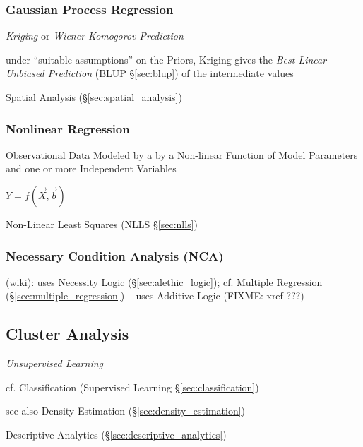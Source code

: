 \subsubsection{Gaussian Process Regression}
\label{sec:gaussian_process_regression}

\emph{Kriging} or \emph{Wiener-Komogorov Prediction}

under ``suitable assumptions'' on the Priors, Kriging gives the \emph{Best
  Linear Unbiased Prediction} (BLUP \S\ref{sec:blup}) of the intermediate values

\fist Spatial Analysis (\S\ref{sec:spatial_analysis})



\subsubsection{Nonlinear Regression}\label{sec:nonlinear_regression}

Observational Data Modeled by a by a Non-linear Function of Model Parameters and
one or more Independent Variables

$Y = f(\vec{X}, \vec{b})$

Non-Linear Least Squares (NLLS \S\ref{sec:nlls})



\subsubsection{Necessary Condition Analysis (NCA)}\label{sec:nca}

(wiki): uses Necessity Logic (\S\ref{sec:alethic_logic});
cf. Multiple Regression (\S\ref{sec:multiple_regression}) -- uses Additive Logic
(FIXME: xref ???)



\subsection{Cluster Analysis}\label{sec:cluster_analysis}

\emph{Unsupervised Learning}

cf. Classification (Supervised Learning \S\ref{sec:classification})

see also Density Estimation (\S\ref{sec:density_estimation})

\fist Descriptive Analytics (\S\ref{sec:descriptive_analytics})

